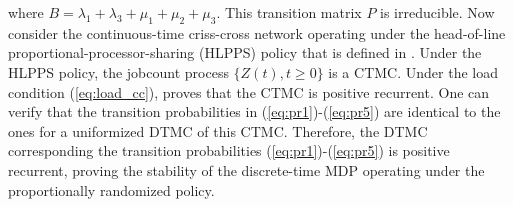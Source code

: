 \documentclass[11pt]{article}
\theoremstyle{definition}
\numberwithin{equation}{section}
\begin{document}
where $B=\lambda_1+\lambda_3+\mu_1+\mu_2+\mu_3$. This transition
matrix $P$ is irreducible. Now consider the continuous-time
criss-cross network operating under the head-of-line
proportional-processor-sharing (HLPPS) policy that is defined in
\cite{Bramson1996}. Under the HLPPS policy, the jobcount process
$\{Z(t), t\ge 0\}$ is a CTMC. Under the load condition (\ref{eq:load_cc}),
\cite{Bramson1996} proves that the CTMC is positive recurrent. One can
verify that the transition probabilities in
(\ref{eq:pr1})-(\ref{eq:pr5}) are identical to the ones for a
uniformized DTMC of this CTMC. Therefore, the DTMC corresponding the
transition probabilities (\ref{eq:pr1})-(\ref{eq:pr5}) is positive
recurrent, proving the stability of the discrete-time MDP operating under the
proportionally randomized policy.
\end{document}
